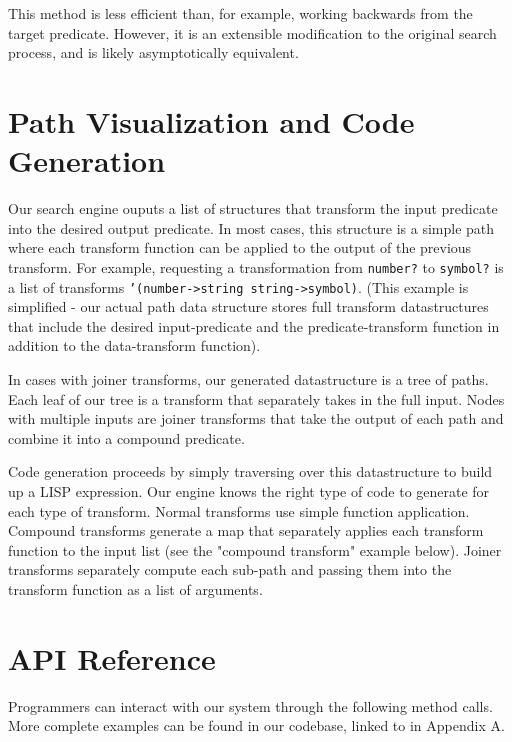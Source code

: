 \documentclass[letterpaper]{article}
\begin{document}
This method is less efficient than, for example, working backwards from the target predicate.  However, it is an extensible modification to the original search process, and is likely asymptotically equivalent.

\section{Path Visualization and Code Generation}
Our search engine ouputs a list of structures that transform the input predicate into the desired output predicate. In most cases, this structure is a simple path where each transform function can be applied to the output of the previous transform. For example, requesting a transformation from \texttt{number?} to \texttt{symbol?} is a list of transforms \texttt{'(number->string string->symbol)}. (This example is simplified - our actual path data structure stores full transform datastructures that include the desired input-predicate and the predicate-transform function in addition to the data-transform function).

In cases with joiner transforms, our generated datastructure is a tree of paths. Each leaf of our tree is a transform that separately takes in the full input. Nodes with multiple inputs are joiner transforms that take the output of each path and combine it into a compound predicate.

Code generation proceeds by simply traversing over this datastructure to build up a LISP expression. Our engine knows the right type of code to generate for each type of transform. Normal transforms use simple function application. Compound transforms generate a map that separately applies each transform function to the input list (see the "compound transform" example below). Joiner transforms separately compute each sub-path and passing them into the transform function as a list of arguments.

\section{API Reference}

Programmers can interact with our system through the following method calls.  More complete examples can be found in our codebase, linked to in Appendix A.

\newcommand{\doc}[3]{\item \texttt{#1}: #2\\\\Example: \texttt{#3}}
\end{document}
